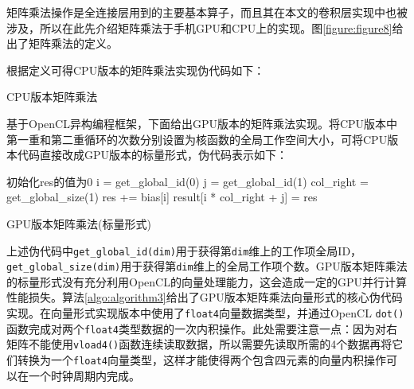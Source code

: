 矩阵乘法操作是全连接层用到的主要基本算子，而且其在本文的卷积层实现中也被涉及，所以在此先介绍矩阵乘法于手机GPU和CPU上的实现。图\ref{figure:figure8}给出了矩阵乘法的定义。

根据定义可得CPU版本的矩阵乘法实现伪代码如下：

\begin{algorithm}[htbp]
  \small
  \SetAlgoLined
    \begin{spacing}{0.9}
    \end{spacing}
  \caption{CPU版本矩阵乘法}
  \label{algo:algorithm1}
\end{algorithm}

基于OpenCL异构编程框架，下面给出GPU版本的矩阵乘法实现。将CPU版本中第一重和第二重循环的次数分别设置为核函数的全局工作空间大小，可将CPU版本代码直接改成GPU版本的标量形式，伪代码表示如下：

\begin{algorithm}[htbp]
  \small
  \SetAlgoLined
    \begin{spacing}{0.9}
    初始化res的值为0\;
  i = get\_global\_id(0)\;
  j = get\_global\_id(1)\;
  col\_right = get\_global\_size(1)\;
    res += bias[i]\;
  result[i * col\_right + j] = res\;
    \end{spacing}
  \caption{GPU版本矩阵乘法(标量形式)}
  \label{algo:algorithm2}
\end{algorithm}

上述伪代码中\texttt{get\_global\_id(dim)}用于获得第\texttt{dim}维上的工作项全局ID，\texttt{get\_global\_size(dim)}用于获得第\texttt{dim}维上的全局工作项个数。GPU版本矩阵乘法的标量形式没有充分利用OpenCL的向量处理能力，这会造成一定的GPU并行计算性能损失。算法\ref{algo:algorithm3}给出了GPU版本矩阵乘法向量形式的核心伪代码实现。在向量形式实现版本中使用了\texttt{float4}向量数据类型，并通过OpenCL \texttt{dot()}函数完成对两个\texttt{float4}类型数据的一次内积操作。此处需要注意一点：因为对右矩阵不能使用\texttt{vload4()}函数连续读取数据，所以需要先读取所需的4个数据再将它们转换为一个\texttt{float4}向量类型，这样才能使得两个包含四元素的向量内积操作可以在一个时钟周期内完成。

